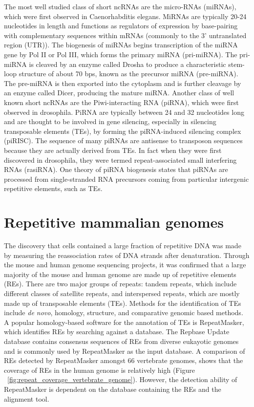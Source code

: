 The most well studied class of short ncRNAs are the micro-RNAs (miRNAs), which were first observed in Caenorhabditis elegans\cite{pmid8252621}. MiRNAs are typically 20-24 nucleotides in length and functions as regulators of expression by base-pairing with complementary sequences within mRNAs (commonly to the 3' untranslated region (UTR)). The biogenesis of miRNAs begins transcription of the miRNA gene by Pol II or Pol III, which forms the primary miRNA (pri-miRNA). The pri-miRNA is cleaved by an enzyme called Drosha\cite{pmid14508493} to produce a characteristic stem-loop structure of about 70 bps, known as the precursor miRNA (pre-miRNA). The pre-miRNA is then exported into the cytoplasm and is further cleavage by an enzyme called Dicer\cite{pmid11201747}, producing the mature miRNA. Another class of well known short ncRNAs are the Piwi-interacting RNA (piRNA), which were first observed in drosophila\cite{pmid11470406}. PiRNA are typically between 24 and 32 nucleotides long and are thought to be involved in gene silencing, especially in silencing transposable elements (TEs), by forming the piRNA-induced silencing complex (piRISC). The sequence of many piRNAs are antisense to transposon sequences because they are actually derived from TEs. In fact when they were first discovered in drosophila, they were termed repeat-associated small interfering RNAs (rasiRNA). One theory of piRNA biogenesis states that piRNAs are processed from single-stranded RNA precursors coming from particular intergenic repetitive elements, such as TEs\cite{pmid21427766}.

\section{Repetitive mammalian genomes}

The discovery that cells contained a large fraction of repetitive DNA was made by measuring the reassociation rates of DNA strands after denaturation\cite{Britten1968}. Through the mouse\cite{pmid12466850} and human\cite{venter2001sequence, lander2001initial} genome sequencing projects, it was confirmed that a large majority of the mouse and human genome are made up of repetitive elements (REs). There are two major groups of repeats: tandem repeats, which include different classes of satellite repeats, and interspersed repeats, which are mostly made up of transposable elements (TEs)\cite{pmid9666329}. Methods for the identification of TEs include \textit{de novo}, homology, structure, and comparative genomic based methods\cite{Bergman01112007}. A popular homology-based software for the annotation of TEs is RepeatMasker, which identifies REs by searching against a database\cite{pmid19274634}. The Repbase Update database\cite{pmid16093699} contains consensus sequences of REs from diverse eukayotic genomes and is commonly used by RepeatMasker as the input database. A comparison of REs detected by RepeatMasker amongst 66 vertebrate genomes, shows that the coverage of REs in the human genome is relatively high (Figure ~\ref{fig:repeat_coverage_vertebrate_genome}). However, the detection ability of RepeatMasker is dependent on the database containing the REs and the alignment tool.

